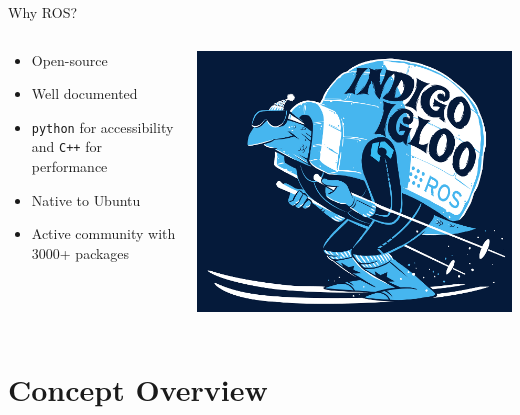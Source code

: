 \documentclass{beamer}
\begin{document}
\begin{frame}{Why ROS?}
\begin{columns}
	\begin{column}{0.55\textwidth}
		\begin{itemize}
			\item Open-source
			\item Well documented
			\item \alert{\texttt{python}} for accessibility and \alert{\texttt{C++}} for performance 
			\item Native to \alert{Ubuntu}
			\item Active community with \alert{3000+} packages
		\end{itemize}
	\end{column}
	\begin{column}{0.45\textwidth}
		\centering
		\includegraphics[width=\textwidth]{fig/indigoigloo_600.png}
	\end{column}
\end{columns}

\end{frame}

\section{Concept Overview}
\end{document}
